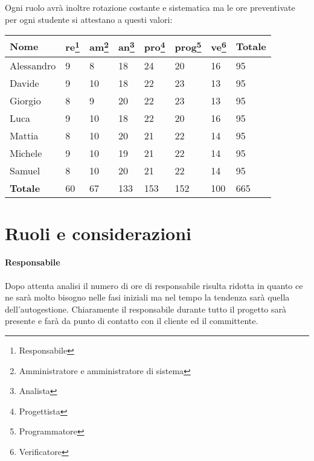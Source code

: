 Ogni ruolo avrà inoltre rotazione costante e sistematica ma le ore preventivate per ogni studente si attestano a questi valori:

\begin{center}
    \begin{tabularx}{13cm}{X |l l l l l l| X}
        \textbf{Nome} & \textbf{re}\footnote{Responsabile}
        & \textbf{am}\footnote{Amministratore e amministratore di sistema}
        & \textbf{an}\footnote{Analista}
        & \textbf{pro}\footnote{Progettista}
        & \textbf{prog}\footnote{Programmatore}
        & \textbf{ve}\footnote{Verificatore}
        & \textbf{Totale} \\
        \hline
        Alessandro      & 9           & 8           & 18          & 24           & 20            & 16          & 95              \\
        Davide          & 9           & 10          & 18          & 22           & 23            & 13          & 95              \\
        Giorgio         & 8           & 9           & 20          & 22           & 23            & 13          & 95              \\
        Luca            & 9           & 10          & 18          & 22           & 20            & 16          & 95              \\
        Mattia          & 8           & 10          & 20          & 21           & 22            & 14          & 95              \\
        Michele         & 9           & 10          & 19          & 21           & 22            & 14          & 95              \\
        Samuel          & 8           & 10          & 20          & 21           & 22            & 14          & 95              \\
        \hline
        \textbf{Totale} & 60          & 67          & 133         & 153          & 152           & 100         & 665
    \end{tabularx}
\end{center}

\section{Ruoli e considerazioni}

\paragraph{Responsabile} Dopo attenta analisi il numero di ore di responsabile risulta ridotta in quanto ce ne sarà molto bisogno nelle fasi iniziali ma nel tempo la tendenza sarà quella dell'autogestione. Chiaramente il responsabile durante tutto il progetto sarà presente e farà da punto di contatto con il cliente ed il committente.

